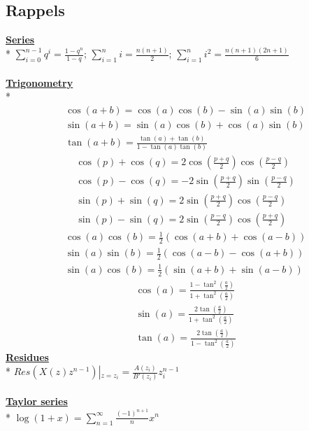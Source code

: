 \documentclass{article}
\newcommand{\para}[1]{\textbf{\underline{#1}}\\*} %
\begin{document}
\subsection{Rappels}
\begin{multicols}{3}
\para{Series}
$ \displaystyle \sum_{i=0}^{n-1} q^i= \frac{1-q^n}{1-q}$;
$  \displaystyle \sum_{i=1}^{n} i= \frac{n(n+1)}{2}$;
$  \displaystyle \sum_{i=1}^{n} i^2= \frac{n(n+1)(2n+1)}{6}$
\\\\\para{Trigonometry}
\begin{align*}
&\cos(a + b) = \cos(a)\cos(b) - \sin(a)\sin(b)\\
&\sin(a + b) = \sin(a)\cos(b) + \cos(a)\sin(b)\\
&\tan(a + b) = \frac{\tan(a) + \tan(b)}{1 - \tan(a)\tan(b)}
\end{align*}
\begin{align*}
&\cos(p) + \cos(q) = 2\cos(\frac{p+q}{2})\cos(\frac{p-q}{2})\\
&\cos(p) - \cos(q) = -2\sin(\frac{p+q}{2})\sin(\frac{p-q}{2})\\
&\sin(p) + \sin(q) = 2\sin(\frac{p+q}{2})\cos(\frac{p-q}{2})\\
&\sin(p) - \sin(q) = 2\sin(\frac{p-q}{2})\cos(\frac{p+q}{2})
\end{align*}
\begin{align*}
&\cos(a)\cos(b) = \frac{1}{2} (\cos(a + b) + \cos(a - b))\\
&\sin(a)\sin(b) = \frac{1}{2} (\cos(a - b) - \cos(a + b))\\
&\sin(a)\cos(b) = \frac{1}{2} (\sin(a + b) + \sin(a - b))
\end{align*}
\begin{align*}
&\cos(a) = \frac{1-\tan^2(\frac{a}{2})}{1+\tan^2(\frac{a}{2})}\\
&\sin(a) = \frac{2\tan(\frac{a}{2})}{1+\tan^2(\frac{a}{2})}\\
&\tan(a) = \frac{2\tan(\frac{a}{2})}{1-\tan^2(\frac{a}{2})}
\end{align*}
\para{Residues}
$Res(X(z)z^{n-1})\left | _{z=z_i} \right. = \frac{A(z_i)}{B'(z_i)}z_i^{n-1}$
\\\\\para{Taylor series}
$ \log(1+x) = \sum_{n=1}^{\infty} \frac{(-1)^{n+1}}n x^n$\\

\end{multicols}
\end{document}
